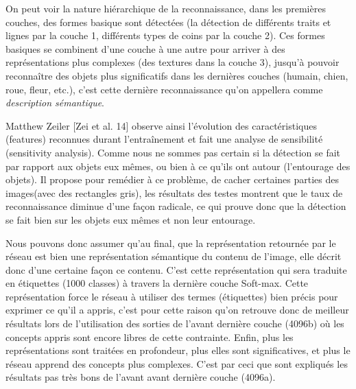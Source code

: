 	On peut voir la nature hiérarchique de la reconnaissance, dans les premières couches, des formes basique sont détectées (la détection de différents traits et lignes par la couche 1, différents types de coins par la couche 2). Ces formes basiques se combinent d'une couche à une autre pour arriver à des représentations plus complexes (des textures dans la couche 3), jusqu’à pouvoir reconnaître des objets plus significatifs dans les dernières couches (humain, chien, roue, fleur, etc.), c'est cette dernière reconnaissance qu'on appellera comme \textit{description sémantique}.

	Matthew Zeiler [Zei et al. 14] observe ainsi l’évolution des caractéristiques (features) reconnues durant l’entraînement et fait une analyse de sensibilité (sensitivity analysis). Comme nous ne sommes pas certain si la détection se fait par rapport aux objets eux mêmes, ou bien à ce qu'ils ont autour (l'entourage des objets). Il propose pour remédier à ce problème, de cacher certaines parties des images(avec des rectangles gris), les résultats des testes montrent que le taux de reconnaissance diminue d'une façon radicale, ce qui prouve donc que la détection se fait bien sur les objets eux mêmes et non leur entourage.

	Nous pouvons donc assumer qu'au final, que la représentation retournée par le réseau est bien une représentation sémantique du contenu de l'image, elle décrit donc d'une certaine façon ce contenu. C'est cette représentation qui sera traduite en étiquettes (1000 classes) à travers la dernière couche Soft-max. 		Cette représentation force le réseau à utiliser des termes (étiquettes) bien précis pour exprimer ce qu'il a appris, c'est pour cette raison qu'on retrouve donc de meilleur résultats lors de l'utilisation des sorties de l'avant dernière couche (4096b) où les concepts appris sont encore libres de cette contrainte. Enfin, plus les représentations sont traitées en profondeur, plus elles sont significatives, et plus le réseau apprend des concepts plus complexes. C'est par ceci que sont expliqués les résultats pas très bons de l'avant avant dernière couche (4096a).

